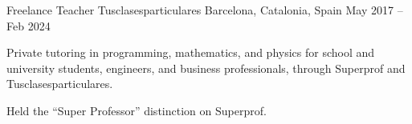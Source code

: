 \begin{cventries}
    \vspace{3mm}
    \cventry
    {Freelance Teacher}
    {Tusclasesparticulares}
    {Barcelona, Catalonia, Spain}
    {May 2017 -- Feb 2024}
    {
       \begin{cvitems}
            \item {Private tutoring in programming, mathematics, and physics for school and university students, engineers, and business professionals, through Superprof and Tusclasesparticulares.}
            \item {Held the ``Super Professor'' distinction on Superprof.}
       \end{cvitems}
    }

\end{cventries}
